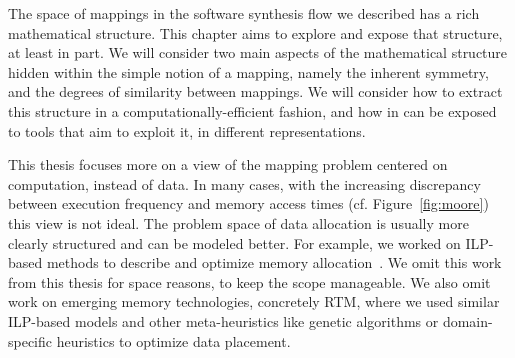 The space of mappings in the software synthesis flow we described has a rich mathematical structure.
This chapter aims to explore and expose that structure, at least in part.
We will consider two main aspects of the mathematical structure hidden within the simple notion of a mapping, namely the inherent symmetry, and the degrees of similarity between mappings.
We will consider how to extract this structure in a computationally-efficient fashion, and how in can be exposed to tools that aim to exploit it, in different representations.

This thesis focuses more on a view of the mapping problem centered on computation, instead of data.
In many cases, with the increasing discrepancy between execution frequency and memory access times (cf. Figure~\ref{fig:moore}) this view is not ideal.
The problem space of data allocation is usually more clearly structured and can be modeled better. 
For example, we worked on \ac{ILP}-based methods to describe and optimize memory allocation~\cite{odendahl_date14,odendahl15,goens_jsa16}.
We omit this work from this thesis for space reasons, to keep the scope manageable.
We also omit work on emerging memory technologies, concretely \ac{RTM}, where we used similar \ac{ILP}-based models and other meta-heuristics like genetic algorithms or domain-specific heuristics to optimize data placement.